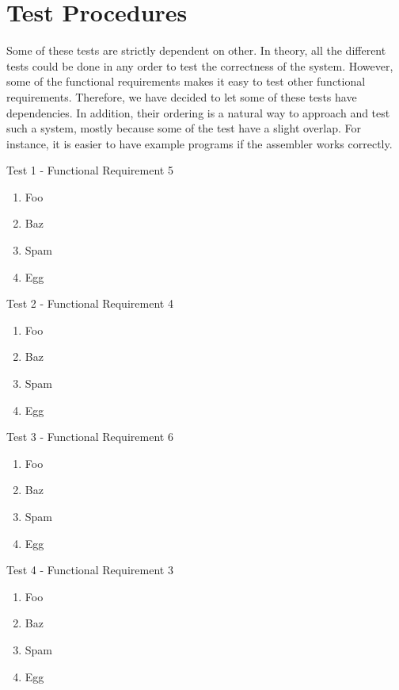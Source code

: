\section{Test Procedures}

Some of these tests are strictly dependent on other. In theory, all the
different tests could be done in any order to test the correctness of the
system. However, some of the functional requirements makes it easy to test other
functional requirements. Therefore, we have decided to let some of these tests
have dependencies. In addition, their ordering is a natural way to approach and
test such a system, mostly because some of the test have a slight overlap. For
instance, it is easier to have example programs if the assembler works
correctly.

{\sc Test 1 - Functional Requirement 5}

{\em \FRV}

\begin{enumerate}
\item Foo
\item Baz
\item Spam
\item Egg
\end{enumerate}

{\sc Test 2 - Functional Requirement 4}

{\em \FRIV}

\begin{enumerate}
\item Foo
\item Baz
\item Spam
\item Egg
\end{enumerate}

{\sc Test 3 - Functional Requirement 6}

{\em \FRVI}

\begin{enumerate}
\item Foo
\item Baz
\item Spam
\item Egg
\end{enumerate}

{\sc Test 4 - Functional Requirement 3}

{\em \FRIII}

\begin{enumerate}
\item Foo
\item Baz
\item Spam
\item Egg
\end{enumerate}

